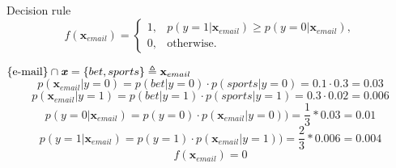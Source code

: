 \documentclass{homework}
\begin{document}
\begin{enumerate}[label=(\alph*)]
Decision rule
\begin{equation*}
	f(\textbf{x}_{email})=
	\begin{cases} 
		1, &  p(y = 1|\textbf{x}_{email})\geq p(y = 0|\textbf{x}_{email}), \\ 
		0, & \text{otherwise}.
	\end{cases}
\end{equation*}

$\{\text{e-mail}\} \cap \textbf{\emph{x}} = \{bet, sports\} \triangleq \textbf{x}_{email}$
\[p(\textbf{x}_{email}|y=0) = p(bet|y = 0) \cdot p(sports|y = 0) = 0.1 \cdot 0.3 = 0.03\]
\[p(\textbf{x}_{email}|y=1) = p(bet|y = 1) \cdot p(sports|y = 1) = 0.3 \cdot 0.02 = 0.006\]
\[p(y = 0|\textbf{x}_{email}) =p(y=0) \cdot p(\textbf{x}_{email}|y=0)) = \frac{1}{3} * 0.03 = 0.01\]
\[p(y = 1|\textbf{x}_{email}) =p(y=1) \cdot p(\textbf{x}_{email}|y=1)) = \frac{2}{3} * 0.006 = 0.004\]
\[f(\textbf{x}_{email}) = 0\]
	
\end{enumerate}
\end{document}
